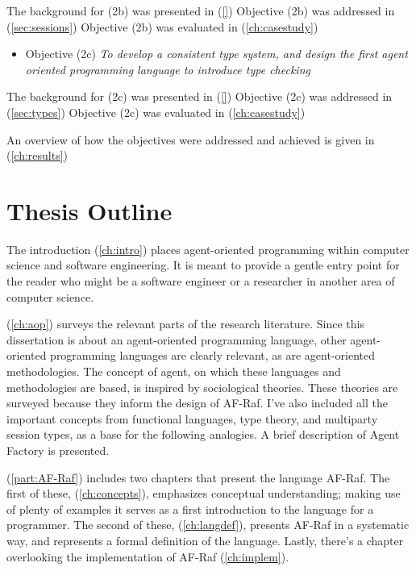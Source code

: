\documentclass[a4paper,12pt,oneside,fleqn]{book} %
\newcommand{\rg}[1]{\marginpar{\tiny\raggedright\textcolor{blue}{\bf rg:} #1}}
\renewcommand{\rg}{}
\begin{document}
The background for (2b) was presented in (\autoref{})
Objective (2b) was addressed in (\autoref{sec:sessions})
Objective (2b) was  evaluated in (\autoref{ch:casestudy})

\begin{itemize}
\item Objective (2c) \textit{To develop a consistent type system,
    and design the first agent oriented programming language to introduce
  type checking}
\end{itemize}

The background for (2c) was presented in (\autoref{})
Objective (2c) was addressed in (\autoref{sec:types})
Objective (2c) was  evaluated in (\autoref{ch:casestudy})

An overview of how the objectives were addressed and achieved is given in
(\autoref{ch:results})


\section{Thesis Outline} %
The introduction (\autoref{ch:intro}) places agent-oriented programming
within computer science and software engineering. It is meant to provide a
gentle entry point for the reader who might be a software engineer or a
researcher in another area of computer science.

(\autoref{ch:aop}) surveys the relevant parts of the research literature. Since this dissertation is about an agent-oriented
programming language, other agent-oriented programming languages are
clearly relevant, as are agent-oriented methodologies. The concept of
agent, on which these languages and methodologies are based, is inspired by
sociological theories. These theories are surveyed because they inform the
design of AF-Raf. I've also included all the important concepts from
functional languages, type theory, and  multiparty session types, as a base
for the following analogies. A brief description of Agent Factory is presented.

(\autoref{part:AF-Raf}) includes two chapters that present the language
AF-Raf. The first of these, (\autoref{ch:concepts}), emphasizes conceptual
understanding; making use of
plenty of examples it serves as a first introduction to the language
for a programmer. The second of these, (\autoref{ch:langdef}), presents
AF-Raf in a systematic way, and represents a formal
definition of the language. Lastly, there's a chapter overlooking the
implementation of AF-Raf (\autoref{ch:implem}).
\end{document}

